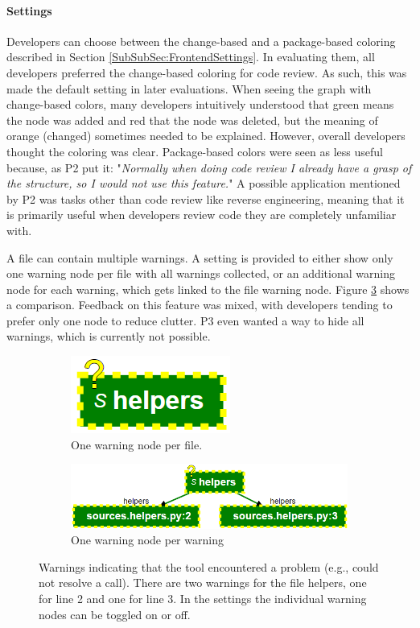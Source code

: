 \documentclass[a4paper,11pt,twoside]{article}
\theoremstyle{definition} %
\begin{document}
\paragraph{Settings} \label{Par:SettingsInterviews} 

Developers can choose between the change-based and a package-based coloring described in Section \ref{SubSubSec:FrontendSettings}. In evaluating them, all developers preferred the change-based coloring for code review. As such, this was made the default setting in later evaluations. When seeing the graph with change-based colors, many developers intuitively understood that green means the node was added and red that the node was deleted, but the meaning of orange (changed) sometimes needed to be explained. However, overall developers thought the coloring was clear. Package-based colors were seen as less useful because, as P2 put it: "\textit{Normally when doing code review I already have a grasp of the structure, so I would not use this feature.}" A possible application mentioned by P2 was tasks other than code review like reverse engineering, meaning that it is primarily useful when developers review code they are completely unfamiliar with.

A file can contain multiple warnings. A setting is provided to either show only one warning node per file with all warnings collected, or an additional warning node for each warning, which gets linked to the file warning node. Figure \ref{fig:warningExpandedComparison} shows a comparison. Feedback on this feature was mixed, with developers tending to prefer only one node to reduce clutter. P3 even wanted a way to hide all warnings, which is currently not possible.

\begin{figure}[h]
\centering
\begin{subfigure}{.5\textwidth}
  \centering
  \includegraphics[width=0.3\linewidth]{Subfigures/warnings_final.PNG}
  \caption{One warning node per file.}
  \label{fig:combined-warnings}
\end{subfigure}%
\begin{subfigure}{.5\textwidth}
  \centering
  \includegraphics[width=0.9\linewidth]{Subfigures/warnings_final_expanded.PNG}
  \caption{One warning node per warning}
  \label{fig:expanded-warnings}
\end{subfigure}
\caption{Warnings indicating that the tool encountered a problem (e.g., could not resolve a call). There are two warnings for the file helpers, one for line 2 and one for line 3. In the settings the individual warning nodes can be toggled on or off.}
\label{fig:warningExpandedComparison}
\end{figure}
\end{document}
